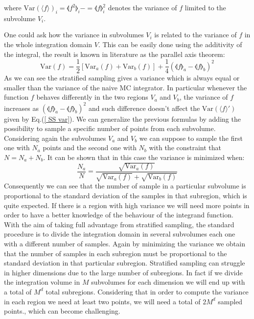 \documentclass[../main/main.tex]{subfiles}
\begin{document}
where $\text{Var}(\langle f \rangle)_{i} = \llangle f^2 \rrangle_i - = \llangle f \rrangle^2_i$ denotes the variance of $f$ limited to the subvolume $V_i$.

One could ask how the variance in subvolumes $V_i$ is related to the variance of $f$ in the whole integration domain $V$. This can be easily done using the additivity of the integral, the result is known in literature as the parallel axis theorem:
\begin{equation}
	\text{Var}(f) = \frac{1}{2} [ \text{Var}_a(f) + \text{Var}_b(f)] + \frac{1}{4} ( 
	\llangle f \rrangle_a - \llangle f \rrangle_b)^2
\end{equation}
As we can see the stratified sampling gives a variance which is always equal or smaller than the variance of the naive MC integrator. In particular whenever the function $f$ behaves differently in 
the two regions $V_a$ and $V_b$, the variance of $f$ increases as $ ( 
\llangle f \rrangle_a - \llangle f \rrangle_b)^2$ and such difference doesn't affect the $\text{Var}(\langle f \rangle')$ given by Eq.(\ref{ SS var}).
\newline
We can generalize the previous formulas by adding the possibility to sample a specific number of 
points from each subvolume. Considering again the subvolumes $V_a$ and $V_b$ we can suppose 
to sample the first one with $N_a$ points and the second one with $N_b$ with the constraint that $N = N_a + N_b$. 
\newline
It can be shown that in this case the variance is minimized when:
\begin{equation}
	\frac{N_a}{N} = \frac{\sqrt{\text{Var}_a(f)}}{\sqrt{\text{Var}_a(f)}+
		\sqrt{\text{Var}_b(f)}}
\end{equation}
Consequently we can see that the number of sample in a particular subvolume is proportional to the standard deviation of the samples in that subregion, which is quite expected. If there is a region with high variance we will need more points in order to have a better knowledge of the behaviour of the 
integrand function.
\newline
With the aim of taking full advantage from stratified sampling, the standard procedure is to divide
the integration domain in several subvolumes each one with a different number of samples. Again by minimizing the variance we obtain that the number of samples in each subregion must be proportional
to the standard deviation in that particular subregion.
\newline
Stratified sampling can struggle in higher dimensions due to the large number of subregions.
In fact if we divide the integration volume in $M$ subvolumes for each dimension we will end up with a total of $M^d$  total subregions. Considering that in order to compute the variance in each region we need at least two points, we will need a total of $2 M^d$ sampled points., which can become challenging.
\end{document}
